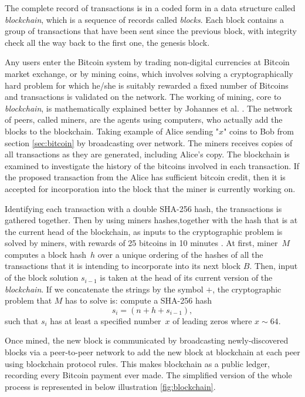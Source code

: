 The complete record of transactions is in a coded form in a data structure called {\it blockchain}, which is a sequence of records called {\it blocks}. Each block contains a group of transactions that have been sent since the previous block, with integrity check all the way back to the first one, the genesis block.

Any users enter the Bitcoin system by trading non-digital currencies at Bitcoin market exchange, or by mining coins, which involves solving a cryptographically hard problem for which he/she is suitably rewarded a fixed number of Bitcoins  and transactions is validated on the network. The working of mining, core to {\it blockchain}, is mathematically explained better by Johannes et al. \cite{Johannes2015}. The network of peers, called miners, are the agents using computers, who actually add the blocks to the blockchain. Taking example of Alice sending "$x$" coins to Bob from section \ref{sec:bitcoin} by broadcasting over network. The miners receives copies of all transactions as they are generated, including Alice's copy. The blockchain is examined to investigate the history of the bitcoins involved in each transaction. If the proposed transaction from the Alice has sufficient bitcoin credit, then it is accepted for incorporation into the block that the miner is currently working on. 


Identifying each transaction with a double SHA-256 hash, the transactions is gathered together. Then by using miners hashes,together with the hash that is at the current head of the blockchain, as inputs to the cryptographic problem is solved by miners, with rewards of 25 bitcoins in 10 minutes \cite{Johannes2015}. At first, miner~$M$ computes a block hash~$h$ over a unique ordering of the hashes of all the transactions that it is intending to incorporate into its next block $B$.  Then, input of the block solution $s_{i-1}$ is taken at the head of its current version of the {\it blockchain}. If we concatenate the strings by the symbol $+$, the cryptographic problem that $M$ has to solve is: compute a SHA-256 hash
%
\begin{equation} \label{eq:2.1}
s_i = (n + h + s_{i-1}),
\end{equation}
%
such that $s_i$ has at least a specified number~$x$ of leading zeros where $x \sim 64$. 

Once mined, the new block is communicated by broadcasting newly-discovered
blocks via a peer-to-peer network to add the new block at blockchain at each peer using blockchain protocol rules. This makes blockchain as a public ledger, recording  every Bitcoin payment ever made. The simplified version of the whole process is represented in below illustration \ref{fig:blockchain}.

